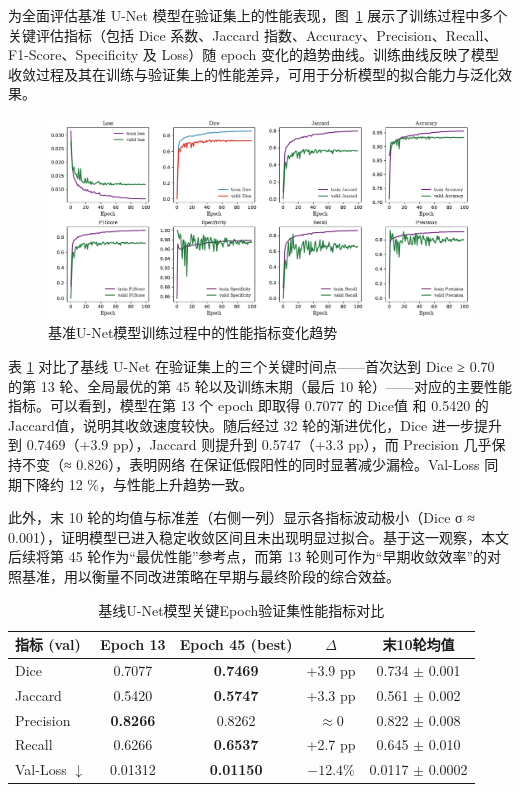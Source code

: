 为全面评估基准 U-Net 模型在验证集上的性能表现，图~\ref{fig:base_unet_metrics} 展示了训练过程中多个关键评估指标（包括 Dice 系数、Jaccard 指数、Accuracy、Precision、Recall、F1-Score、Specificity 及 Loss）随 epoch 变化的趋势曲线。训练曲线反映了模型收敛过程及其在训练与验证集上的性能差异，可用于分析模型的拟合能力与泛化效果。

\begin{figure}[!htbp]
    \centering
    \includegraphics[width=\textwidth]{fig/base_unet_metrics.pdf}
    \caption{基准U-Net模型训练过程中的性能指标变化趋势}
    \label{fig:base_unet_metrics}
\end{figure}

表 \ref{tab:unet_epoch_compare} 对比了基线 U-Net 在验证集上的三个关键时间点——首次达到 Dice ≥ 0.70 的第 13 轮、全局最优的第 45 轮以及训练末期（最后 10 轮）——对应的主要性能指标。可以看到，模型在第 13 个 epoch 即取得 0.7077 的 Dice值 和 0.5420 的 Jaccard值，说明其收敛速度较快。随后经过 32 轮的渐进优化，Dice 进一步提升到 0.7469（+3.9 pp），Jaccard 则提升到 0.5747（+3.3 pp），而 Precision 几乎保持不变（≈ 0.826），表明网络 在保证低假阳性的同时显著减少漏检。Val-Loss 同期下降约 12 \%，与性能上升趋势一致。

此外，末 10 轮的均值与标准差（右侧一列）显示各指标波动极小（Dice σ ≈ 0.001），证明模型已进入稳定收敛区间且未出现明显过拟合。基于这一观察，本文后续将第 45 轮作为“最优性能”参考点，而第 13 轮则可作为“早期收敛效率”的对照基准，用以衡量不同改进策略在早期与最终阶段的综合效益。

\begin{table}[htbp]
    \centering
    \caption{基线U-Net模型关键Epoch验证集性能指标对比}
    \label{tab:unet_epoch_compare}
    \begin{tabular}{lcccc}
        \toprule
        指标 (val) & Epoch 13 & Epoch 45 (best) & $\Delta$ & 末10轮均值 \\
        \midrule
        Dice        & 0.7077 & \textbf{0.7469} & +3.9 pp   & 0.734 $\pm$ 0.001 \\
        Jaccard     & 0.5420 & \textbf{0.5747} & +3.3 pp   & 0.561 $\pm$ 0.002 \\
        Precision   & \textbf{0.8266} & 0.8262 & $\approx$0 & 0.822 $\pm$ 0.008 \\
        Recall      & 0.6266 & \textbf{0.6537} & +2.7 pp   & 0.645 $\pm$ 0.010 \\
        Val-Loss $\downarrow$ & 0.01312 & \textbf{0.01150} & $-12.4\%$ & 0.0117 $\pm$ 0.0002 \\
        \bottomrule
    \end{tabular}
\end{table}

